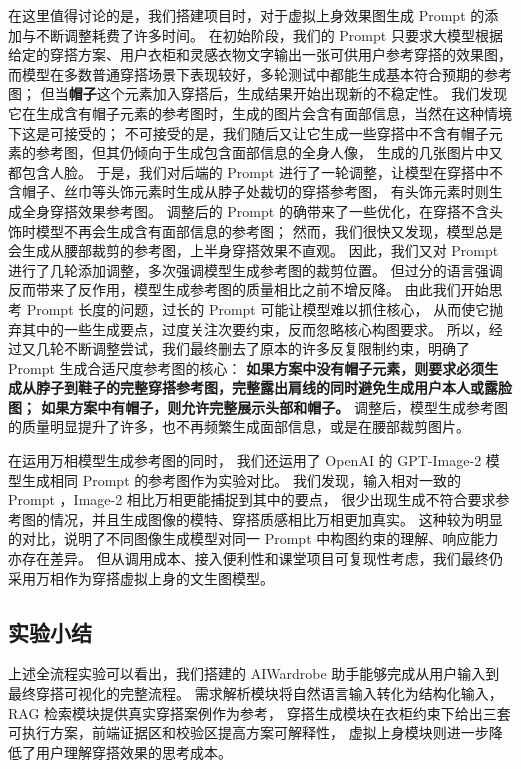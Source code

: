 \documentclass{applemlr}
\begin{document}
在这里值得讨论的是，我们搭建项目时，对于虚拟上身效果图生成 Prompt 的添加与不断调整耗费了许多时间。
在初始阶段，我们的 Prompt 只要求大模型根据给定的穿搭方案、用户衣柜和灵感衣物文字输出一张可供用户参考穿搭的效果图，
而模型在多数普通穿搭场景下表现较好，多轮测试中都能生成基本符合预期的参考图；
但当\textbf{帽子}这个元素加入穿搭后，生成结果开始出现新的不稳定性。
我们发现它在生成含有帽子元素的参考图时，生成的图片会含有面部信息，当然在这种情境下这是可接受的；
不可接受的是，我们随后又让它生成一些穿搭中不含有帽子元素的参考图，但其仍倾向于生成包含面部信息的全身人像，
生成的几张图片中又都包含人脸。
于是，我们对后端的 Prompt 进行了一轮调整，让模型在穿搭中不含帽子、丝巾等头饰元素时生成从脖子处裁切的穿搭参考图，
有头饰元素时则生成全身穿搭效果参考图。
调整后的 Prompt 的确带来了一些优化，在穿搭不含头饰时模型不再会生成含有面部信息的参考图；
然而，我们很快又发现，模型总是会生成从腰部裁剪的参考图，上半身穿搭效果不直观。
因此，我们又对 Prompt 进行了几轮添加调整，多次强调模型生成参考图的裁剪位置。
但过分的语言强调反而带来了反作用，模型生成参考图的质量相比之前不增反降。
由此我们开始思考 Prompt 长度的问题，过长的 Prompt 可能让模型难以抓住核心，
从而使它抛弃其中的一些生成要点，过度关注次要约束，反而忽略核心构图要求。
所以，经过又几轮不断调整尝试，我们最终删去了原本的许多反复限制约束，明确了 Prompt 生成合适尺度参考图的核心：
\textbf{如果方案中没有帽子元素，则要求必须生成从脖子到鞋子的完整穿搭参考图，完整露出肩线的同时避免生成用户本人或露脸图；
如果方案中有帽子，则允许完整展示头部和帽子。}
调整后，模型生成参考图的质量明显提升了许多，也不再频繁生成面部信息，或是在腰部裁剪图片。

在运用万相模型生成参考图的同时，
我们还运用了 OpenAI 的 GPT-Image-2 模型生成相同 Prompt 的参考图作为实验对比。
我们发现，输入相对一致的 Prompt ，Image-2 相比万相更能捕捉到其中的要点，
很少出现生成不符合要求参考图的情况，并且生成图像的模特、穿搭质感相比万相更加真实。
这种较为明显的对比，说明了不同图像生成模型对同一 Prompt 中构图约束的理解、响应能力亦存在差异。
但从调用成本、接入便利性和课堂项目可复现性考虑，我们最终仍采用万相作为穿搭虚拟上身的文生图模型。

\subsection{实验小结}

上述全流程实验可以看出，我们搭建的 AIWardrobe 助手能够完成从用户输入到最终穿搭可视化的完整流程。
需求解析模块将自然语言输入转化为结构化输入， RAG 检索模块提供真实穿搭案例作为参考，
穿搭生成模块在衣柜约束下给出三套可执行方案，前端证据区和校验区提高方案可解释性，
虚拟上身模块则进一步降低了用户理解穿搭效果的思考成本。
\end{document}
